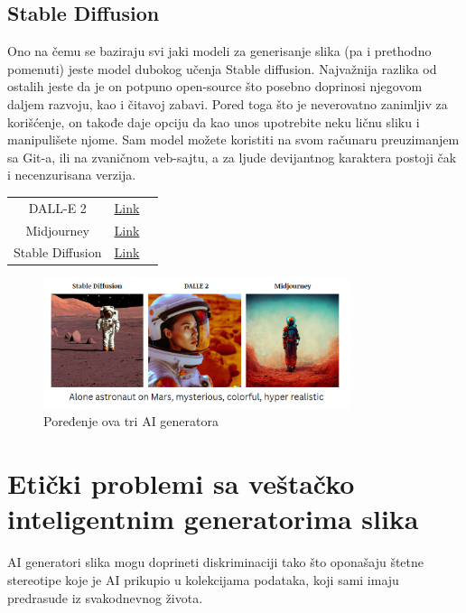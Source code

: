 \documentclass[12pt, letterpaper]{article}
\begin{document}
\subsection{Stable Diffusion}
Ono na čemu se baziraju svi jaki modeli za generisanje slika (pa i prethodno pomenuti) jeste model dubokog učenja Stable diffusion. Najvažnija razlika od ostalih jeste da je on potpuno open-source što posebno doprinosi njegovom daljem razvoju, kao i čitavoj zabavi. Pored toga što je neverovatno zanimljiv za korišćenje, on takođe daje opciju da kao unos upotrebite neku ličnu sliku i manipulišete njome. Sam model možete koristiti na svom računaru preuzimanjem sa Git-a, ili na zvaničnom veb-sajtu, a za ljude devijantnog karaktera postoji čak i necenzurisana verzija.
\begin{center}
\begin{tabular}{ |c|c|c| } 
 \hline
 DALL-E 2 & \href{https://openai.com/dall-e-2/}{Link} \\
 Midjourney & \href{https://www.midjourney.com/}{Link} \\
 Stable Diffusion & \href{https://beta.dreamstudio.ai/dream}{Link} \\
 \hline
\end{tabular}
\end{center}

\begin{figure}[htp]
\centering
\includegraphics[width=0.8\textwidth]{astronaut.png}
\caption{Poređenje ova tri AI generatora}
\label{fig: Astronaut}
\end{figure}
 
\pagebreak

\section{Etički problemi sa veštačko inteligentnim generatorima slika}

AI generatori slika mogu doprineti diskriminaciji tako što oponašaju štetne stereotipe koje je AI prikupio u kolekcijama podataka, koji sami imaju predrasude iz svakodnevnog života.
\end{document}
